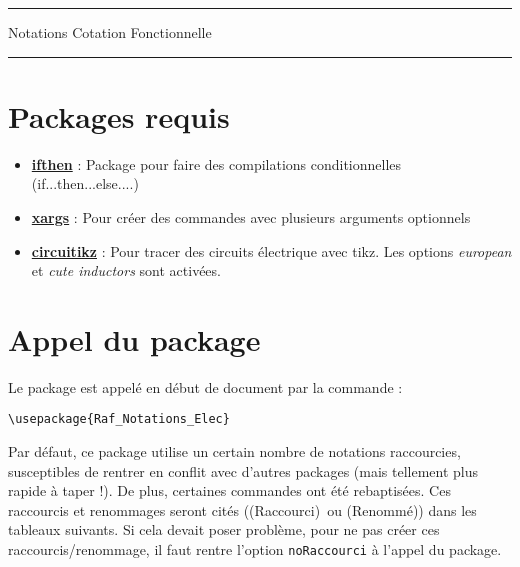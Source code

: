 \documentclass[a4paper,12pt]{article}
\newcommand{\rac}{({\color{red}Raccourci})}
\newcommand{\ren}{({\color{blue}Renommé})}
\begin{document}
	\begin{center}
		\hrule{\Large Notations Cotation Fonctionnelle}\\\hrule
	\end{center}


	\section{Packages requis}

		\begin{itemize}
			\item \href{http://www.ctan.org/pkg/ifthen}{\textbf{ifthen}} : Package pour faire des compilations conditionnelles (if...then...else....)
			\item \href{http://www.ctan.org/pkg/xargs}{\textbf{xargs}} : Pour créer des commandes avec plusieurs arguments optionnels
			\item \href{https://www.ctan.org/pkg/circuitikz}{\textbf{circuitikz}} : Pour tracer des circuits électrique avec tikz. Les options \emph{european} et \emph{cute inductors} sont activées.
		\end{itemize}
		
		
	\section{Appel du package}

		Le package est appelé en début de document par la commande :
		\begin{verbatim}
\usepackage{Raf_Notations_Elec}
		\end{verbatim}

		Par défaut, ce package utilise un certain nombre de notations raccourcies, susceptibles de rentrer en conflit avec d'autres packages (mais tellement plus rapide à taper !).
		De plus, certaines commandes ont été rebaptisées.
		Ces raccourcis et renommages seront cités (\rac\ ou \ren) dans les tableaux suivants.
		Si cela devait poser problème, pour ne pas créer ces raccourcis/renommage, il faut rentre l'option \verb!noRaccourci! à l'appel du package.
\end{document}
